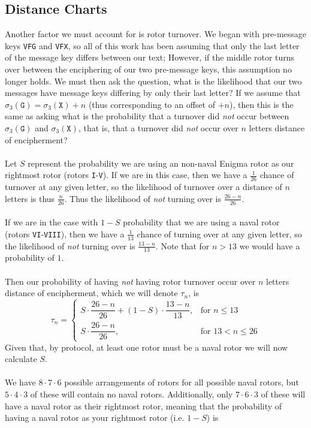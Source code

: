 \subsection{Distance Charts}
Another factor we must account for is rotor turnover. We began with pre-message keys \texttt{VFG} and \texttt{VFX}, so all of this work has been assuming that only the last letter of the message key differs between our text; However, if the middle rotor turns over between the enciphering of our two pre-message keys, this assumption no longer holds. We must then ask the question, what is the likelihood that our two messages have message keys differing by only their last letter? If we assume that $\sigma_3(\texttt{G}) = \sigma_3(\texttt{X}) + n$ (thus corresponding to an offset of $+n$), then this is the same as asking what is the probability that a turnover did \emph{not} occur between $\sigma_3(\texttt{G})$ and $\sigma_3(\texttt{X})$, that is, that a turnover did \emph{not} occur over $n$ letters distance of encipherment?
\\\\Let $S$ represent the probability we are using an non-naval Enigma rotor as our rightmost rotor (rotors \texttt{I}-\texttt{V}). If we are in this case, then we have a $\frac{1}{26}$ chance of turnover at any given letter, so the likelihood of turnover over a distance of $n$ letters is thus $\frac{n}{26}$. Thus the likelihood of \emph{not} turning over is $\frac{26-n}{26}$.
\\\\If we are in the case with $1-S$ probability that we are using a naval rotor (rotors \texttt{VI}-\texttt{VIII}), then we have a $\frac{1}{13}$ chance of turning over at any given letter, so the likelihood of \emph{not} turning over is $\frac{13-n}{13}$. Note that for $n>13$ we would have a probability of $1$.
\\\\Then our probability of having \emph{not} having rotor turnover occur over $n$ letters distance of encipherment, which we will denote $\tau_n$, is
\[
	\tau_n =
	\begin{cases}
		S \cdot \dfrac{26 - n}{26} + (1 - S) \cdot \dfrac{13 - n}{13}, & \text{for } n \le 13      \\
		S \cdot \dfrac{26 - n}{26},                                    & \text{for } 13 < n \le 26
	\end{cases}
\]
Given that, by protocol, at least one rotor must be a naval rotor we will now calculate $S$.
\\\\We have $8\cdot7\cdot6$ possible arrangements of rotors for all possible naval rotors, but $5\cdot4\cdot3$ of these will contain no naval rotors. Additionally, only $7\cdot6\cdot3$ of these will have a naval rotor as their rightmost rotor, meaning that the probability of having a naval rotor as your rightmost rotor (i.e. $1-S$) is
